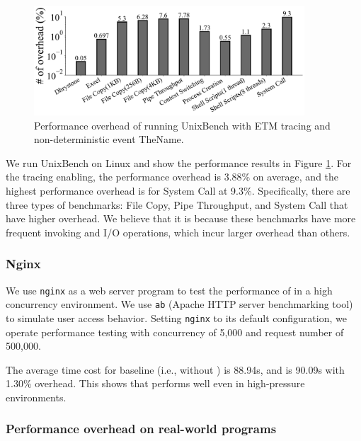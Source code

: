 \begin{figure}
    \centering
    \includegraphics[width=0.9\textwidth]{figures/unixbenchoverheadbar.pdf}
    \caption{Performance overhead of running UnixBench with ETM tracing and non-deterministic event TheName.}
    \label{fig:Performance overhead of running UnixBench}
\end{figure}

We run UnixBench on Linux and show the performance results in Figure
\ref{fig:Performance overhead of running UnixBench}. For the tracing enabling,
the performance overhead is 3.88\% on average, and the highest performance
overhead is for System Call at 9.3\%. Specifically, there are three types of
benchmarks: File Copy, Pipe Throughput, and System Call that have higher
overhead. We believe that it is because these benchmarks have more frequent
\syscall{} invoking and I/O operations, which incur larger overhead than others.

\subsubsection{Nginx} \label{subsec:eva-Performance-Nginx}

We use \texttt{nginx} \cite{nginx_1.20.0} as a web server program to test the
performance of \TheName in a high concurrency environment. We use \texttt{ab}
(Apache HTTP server benchmarking tool) \cite{ApacheBench} to simulate user
access behavior. Setting \texttt{nginx} to its default configuration, we operate
performance testing with concurrency of 5,000 and request number of 500,000.

The average time cost for baseline (i.e., without \TheName) is 88.94s, and
\TheName is 90.09s with 1.30\% overhead. This shows that \TheName performs well
even in high-pressure environments.

\subsubsection{Performance overhead on real-world programs} \label{subsec:eva-Performance-Normal}

